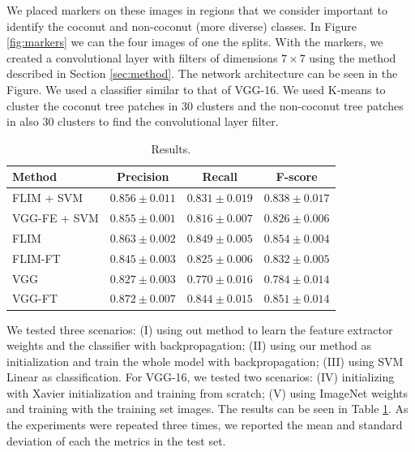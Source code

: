 \documentclass[a4paper,conference]{IEEEtran}
\begin{document}
We placed markers on these images in regions that we consider important to identify the coconut and non-coconut (more diverse) classes. In Figure \ref{fig:markers} we can the four images of one the splits. With the markers, we created a convolutional layer with filters of dimensions $7 \times 7$ using the method described in Section \ref{sec:method}. The network architecture can be seen in the Figure. We used a classifier similar to that of VGG-16. We used K-means to cluster the coconut tree patches in 30 clusters and the non-coconut tree patches in also 30 clusters to find the convolutional layer filter. 

\begin{table}[!t]
  \begin{center}
  \begin{tabular}{|l|c|c|c|}
  \hline
   Method & Precision & Recall & F-score \\
  \hline\hline
    FLIM + SVM & $0.856 \pm 0.011 $ & $ 0.831 \pm 0.019$ & $ 0.838 \pm 0.017$\\ 
    VGG-FE + SVM & $0.855 \pm 0.001$ & $0.816 \pm 0.007$ & $0.826 \pm 0.006 $ \\\hline
      
    FLIM & $0.863 \pm 0.002$ & $0.849 \pm 0.005$ & $0.854 \pm 0.004$\\
    FLIM-FT & $0.845 \pm 0.003$ & $0.825\pm 0.006$ & $0.832 \pm 0.005$ \\

    VGG & $0.827 \pm 0.003$ & $0.770 \pm 0.016$  & $ 0.784 \pm 0.014$\\
    VGG-FT & $0.872 \pm 0.007$ & $0.844 \pm 0.015$ & $0.851 \pm 0.014 $ \\
   
  \hline
  \end{tabular}
  \end{center}
  \caption{Results.}
  \label{tab:results}
\end{table}


We tested three scenarios: (I) using out method to learn the feature extractor weights and the classifier with backpropagation; (II) using our method as initialization and train the whole model with backpropagation; (III) using SVM Linear as classification. For VGG-16, we tested two scenarios: (IV) initializing with Xavier initialization and training from scratch; (V) using ImageNet weights and training with the training set images. The results can be seen in Table \ref{tab:results}. As the experiments were repeated three times, we reported the mean and standard deviation of each the metrics in the test set. 
\end{document}
